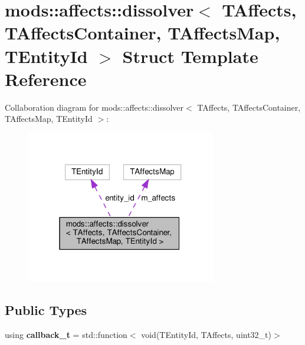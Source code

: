 \hypertarget{structmods_1_1affects_1_1dissolver}{}\section{mods\+:\+:affects\+:\+:dissolver$<$ T\+Affects, T\+Affects\+Container, T\+Affects\+Map, T\+Entity\+Id $>$ Struct Template Reference}
\label{structmods_1_1affects_1_1dissolver}


Collaboration diagram for mods\+:\+:affects\+:\+:dissolver$<$ T\+Affects, T\+Affects\+Container, T\+Affects\+Map, T\+Entity\+Id $>$\+:\nopagebreak
\begin{figure}[H]
\begin{center}
\leavevmode
\includegraphics[width=235pt]{structmods_1_1affects_1_1dissolver__coll__graph}
\end{center}
\end{figure}
\subsection*{Public Types}
\begin{DoxyCompactItemize}
\item 
\mbox{\label{structmods_1_1affects_1_1dissolver_abcac7d436cb1fba4928b57e0ca854f01}} 
using {\bfseries callback\+\_\+t} = std\+::function$<$ void(T\+Entity\+Id, T\+Affects, uint32\+\_\+t)$>$
\end{DoxyCompactItemize}
